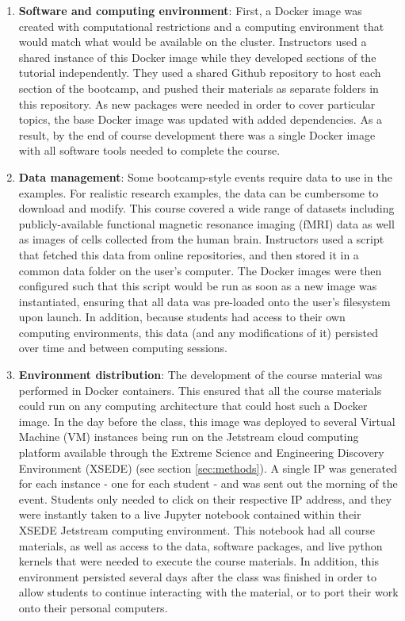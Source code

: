 \begin{enumerate}

\item {\bf Software and computing environment}: First, a Docker image
\cite{merkel2014docker} was created with computational restrictions and a
computing environment that would match what would be available on the cluster.
Instructors used a shared instance of this Docker image while they developed
sections of the tutorial independently. They used a shared Github repository to
host each section of the bootcamp, and pushed their materials as separate
folders in this repository. As new packages were needed in order to cover
particular topics, the base Docker image was updated with added dependencies. As
a result, by the end of course development there was a single Docker image with
all software tools needed to complete the course.

\item {\bf Data management}: Some bootcamp-style events require data to use in
the examples. For realistic research examples, the data can be cumbersome to
download and modify. This course covered a wide range of datasets including
publicly-available functional magnetic resonance imaging (fMRI) data as well as
images of cells collected from the human brain. Instructors used a script that
fetched this data from online repositories, and then stored it in a common data
folder on the user's computer. The Docker images were then configured such that
this script would be run as soon as a new image was instantiated, ensuring that
all data was pre-loaded onto the user's filesystem upon launch. In addition,
because students had access to their own computing environments, this data (and
any modifications of it) persisted over time and between computing sessions.

\item {\bf Environment distribution}: The development of the course material was
performed in Docker containers. This ensured that all the course materials could run
on any computing architecture that could host such a Docker image. In the day
before the class, this image was deployed to several Virtual Machine (VM)
instances being run on the Jetstream cloud computing platform
\cite{Stewart2014Jestream} available through the Extreme Science and Engineering
Discovery Environment (XSEDE) \cite{Towns2014XSEDE}  (see section
\ref{sec:methods}). A single IP was generated for each instance - one for each
student - and was sent out the morning of the event. Students only needed to
click on their respective IP address, and they were instantly taken to a live
Jupyter notebook contained within their XSEDE Jetstream computing
environment. This notebook had all course materials, as well as access to the
data, software packages, and live python kernels that were needed to execute the
course materials. In addition, this environment persisted several days after the
class was finished in order to allow students to continue interacting with the
material, or to port their work onto their personal computers.

\end{enumerate}

